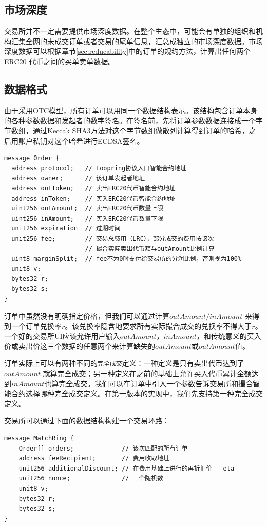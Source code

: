 \documentclass[UTF8,nofonts]{ctexart}
\begin{document}
\subsection{市场深度\label{sec:marketdepth}}

交易所并不一定需要提供市场深度数据。在整个生态中，可能会有单独的组织和机构汇集全网的未成交订单或者交易的尾单信息，汇总成独立的市场深度数据。市场深度数据可以根据章节\ref{sec:reducability}中的订单的规约方法，计算出任何两个ERC20 代币之间的买单卖单数据。

\subsection{数据格式\label{sec:dataformat}}

由于采用OTC模型，所有订单可以用同一个数据结构表示。该结构包含订单本身的各种参数数据和发起者的数字签名。在签名前，先将订单参数数据连接成一个字节数组，通过Keccak SHA3方法对这个字节数组做散列计算得到订单的哈希，之后用账户私钥对这个哈希进行ECDSA签名。


\begin{verbatim}
message Order {
  address protocol;   // Loopring协议入口智能合约地址
  address owner;      // 该订单发起者地址
  address outToken;   // 卖出ERC20代币智能合约地址
  address inToken;    // 买入ERC20代币智能合约地址
  uint256 outAmount;  // 卖出ERC20代币数量上限
  uint256 inAmount;   // 买入ERC20代币数量下限
  unit256 expiration  // 过期时间
  unit256 fee;        // 交易总费用（LRC），部分成交的费用按该次
                      // 撮合实际卖出代币额与outAmount比例计算
  uint8 marginSplit;  // fee不为0时支付给交易所的分润比例，否则视为100%
  unit8 v;
  bytes32 r;
  bytes32 s;
}
\end{verbatim}

订单中虽然没有明确指定价格，但我们可以通过计算$outAmount / inAmount$ 来得到一个订单兑换率$r$。该兑换率隐含地要求所有实际撮合成交的兑换率不得大于$r$。 一个好的交易所UI应该允许用户输入$outAmount$，$inAmount$，和传统意义的买入价或卖出价这三个数据的任意两个来计算缺失的$outAmount$或$outAmount$值。

订单实际上可以有两种不同的\texttt{完全成交}定义：一种定义是只有卖出代币达到了$outAmount$ 就算完全成交；另一种定义在之前的基础上允许买入代币累计金额达到$inAmount$也算完全成交。我们可以在订单中引入一个参数告诉交易所和撮合智能合约选择哪种完全成交定义。在第一版本的实现中，我们先支持第一种完全成交定义。


交易所可以通过下面的数据结构构建一个交易环路：
\begin{verbatim}
message MatchRing {
    Order[] orders;             // 该次匹配的所有订单
    address feeRecipient;       // 费用收取地址
    unit256 additionalDiscount; // 在费用基础上进行的再折扣价 - eta
    unit256 nonce;              // 一个随机数
    unit8 v;
    bytes32 r;
    bytes32 s;
}
\end{verbatim}
\end{document}
